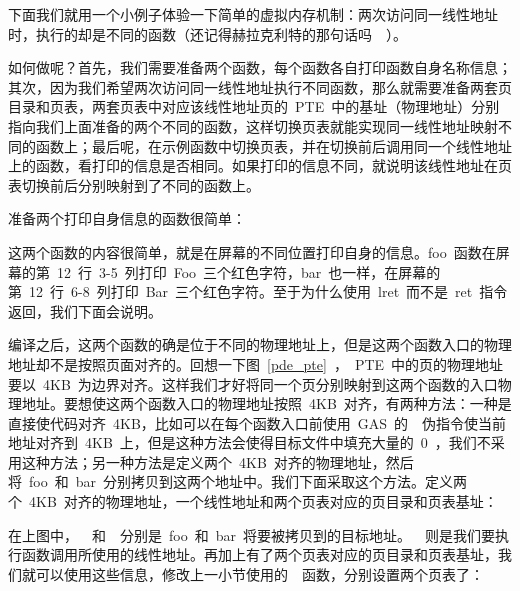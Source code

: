 下面我们就用一个小例子体验一下简单的虚拟内存机制：两次访问同一线性地址时，执行的却是不同的函数（还记得赫拉克利特的那句话吗~\smiley~）。

如何做呢？首先，我们需要准备两个函数，每个函数各自打印函数自身名称信息；其次，因为我们希望两次访问同一线性地址执行不同函数，那么就需要准备两套页目录和页表，两套页表中对应该线性地址页的~PTE~中的基址（物理地址）分别指向我们上面准备的两个不同的函数，这样切换页表就能实现同一线性地址映射不同的函数上；最后呢，在示例函数中切换页表，并在切换前后调用同一个线性地址上的函数，看打印的信息是否相同。如果打印的信息不同，就说明该线性地址在页表切换前后分别映射到了不同的函数上。

准备两个打印自身信息的函数很简单：


这两个函数的内容很简单，就是在屏幕的不同位置打印自身的信息。foo~函数在屏幕的第~12~行~3-5~列打印~Foo~三个红色字符，bar~也一样，在屏幕的第~12~行~6-8~列打印~Bar~三个红色字符。至于为什么使用~lret~而不是~ret~指令返回，我们下面会说明。

编译之后，这两个函数的确是位于不同的物理地址上，但是这两个函数入口的物理地址却不是按照页面对齐的。回想一下图~\ref{pde_pte}~，~PTE~中的页的物理地址要以~4KB~为边界对齐。这样我们才好将同一个页分别映射到这两个函数的入口物理地址。要想使这两个函数入口的物理地址按照~4KB~对齐，有两种方法：一种是直接使代码对齐~4KB，比如可以在每个函数入口前使用~GAS~的~~伪指令使当前地址对齐到~4KB~上，但是这种方法会使得目标文件中填充大量的~0~，我们不采用这种方法；另一种方法是定义两个~4KB~对齐的物理地址，然后将~foo~和~bar~分别拷贝到这两个地址中。我们下面采取这个方法。定义两个~4KB~对齐的物理地址，一个线性地址和两个页表对应的页目录和页表基址：


在上图中，~~和~~分别是~foo~和~bar~将要被拷贝到的目标地址。~~则是我们要执行函数调用所使用的线性地址。再加上有了两个页表对应的页目录和页表基址，我们就可以使用这些信息，修改上一小节使用的~~函数，分别设置两个页表了：


